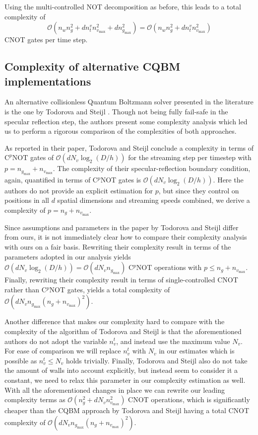 Using the multi-controlled NOT decomposition as before, this leads to a total complexity of 
$$\mathcal{O}\left (  n_w n_g^2 + d n^v_t n_{v_\text{max}}^2 + d n_{g_\text{max}}^2 \right ) =\mathcal{O}\left (  n_w n_g^2 + d n^v_t n_{v_\text{max}}^2 \right )$$ CNOT gates per time step.


\subsection{Complexity of alternative CQBM implementations}\label{ssec:comp_soa_q}
An alternative collisionless Quantum Boltzmann solver presented in the literature is the one by Todorova and Steijl \cite{Todorova2020}. Though not being fully fail-safe in the specular reflection step, the authors present some complexity analysis which led us to perform a rigorous comparison of the complexities of both approaches.

As reported in their paper, Todorova and Steijl conclude a complexity in terms of $\text{C}^p\text{NOT}$ gates of $\mathcal{O}\left ( d N_v \log_2 \left ( D / h  \right ) \right )$ for the streaming step per timestep with $p=n_{g_\text{max}} + n_{v_\text{max}}$. The complexity of their specular-reflection boundary condition, again, quantified in terms of C$^p$NOT gates is $\mathcal{O}\left ( d N_v \log_2 \left ( D / h  \right ) \right )$. Here the authors do not provide an explicit estimation for $p$, but since they control on positions in all $d$ spatial dimensions and streaming speeds combined, we derive a complexity of $p = n_{g} +n_{v_\text{max}}$.

Since assumptions and parameters in the paper by Todorova and Steijl differ from ours, it is not immediately clear how to compare their complexity analysis with ours on a fair basis. 
Rewriting their complexity result in terms of the parameters adopted in our analysis yields $\mathcal{O}\left ( d N_v \log_2 \left ( D / h  \right ) \right ) = \mathcal{O}\left  (d N_v n_{g_\text{max}} \right ) $ C$^p$NOT operations with $p \leq n_{g} +n_{v_\text{max}}$.
Finally, rewriting their complexity result in terms of single-controlled CNOT rather than C$^p$NOT gates, yields a total complexity of $\mathcal{O}\left ( d N_v n_{g_\text{max}} (n_{g} +n_{v_\text{max}})^2 \right )$.

Another difference that makes our complexity hard to compare with the complexity of the algorithm of Todorova and Steijl is that the aforementioned authors do not adopt the variable $n_v^t$, and instead use the maximum value $N_v$. For ease of comparison we will replace $n_v^t$ with $N_v$ in our estimates which is possible as $n_v^t \leq N_v$ holds trivially.
Finally, Todorova and Steijl also do not take the amount of walls into account explicitly, but instead seem to consider it a constant, we need to relax this parameter in our complexity estimation as well. With all the aforementioned changes in place we can rewrite our leading complexity terms as $\mathcal{O}\left ( n_g^2 + d N_v n_{v_\text{max}}^2 \right )$ CNOT operations, which is significantly cheaper than the CQBM approach by Todorova and Steijl having a total CNOT complexity of $\mathcal{O}\left ( d N_v n_{g_\text{max}} (n_{g} +n_{v_\text{max}})^2 \right )$.

